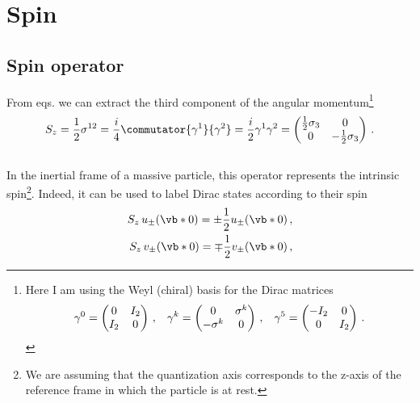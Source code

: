 \chapter{Spin}
\label{app:spin}

\section{Spin operator}
From eqs. we can extract the third component of the angular momentum\footnote{Here I am using the Weyl (chiral) basis for the Dirac matrices
\begin{equation*}
    \gamma^0 = \begin{pmatrix}
        0 & I_2\\
        I_2 & 0
    \end{pmatrix} \, , 
    \hspace{3mm}
    \gamma^k = \begin{pmatrix}
        0 & \sigma^k\\
    -\sigma^{k} & 0
    \end{pmatrix} \, ,
    \hspace{3mm}
    \gamma^5 = \begin{pmatrix}
        -I_2 & 0\\
        0 & I_2
    \end{pmatrix}\,.
\end{equation*}
}
\\
\begin{equation}
    S_z = \frac{1}{2} \sigma^{12} = \frac{i}{4} \commutator{\gamma^1}{\gamma^2} = \frac{i}{2} \gamma^1 \gamma^2 = 
    \begin{pmatrix}
        \frac{1}{2} \sigma_3 & 0 \\
        0 & -\frac{1}{2} \sigma_3
    \end{pmatrix} \,.
\end{equation}
\\
In the inertial frame of a massive particle, this operator represents the intrinsic spin\footnote{We are assuming that the quantization axis corresponds to the z-axis of the reference frame in which the particle is at rest.}. Indeed, it can be used to label Dirac states according to their spin
\\
\begin{equation}
    \begin{split}
        S_z \, u_{\pm}(\vb*{0}) = \pm \frac{1}{2} u_{\pm}(\vb*{0})\, ,\\
        S_z \, v_{\pm}(\vb*{0}) = \mp \frac{1}{2} v_{\pm}(\vb*{0})\, ,
    \end{split}
    \label{eq:spin_dirac}
\end{equation}
